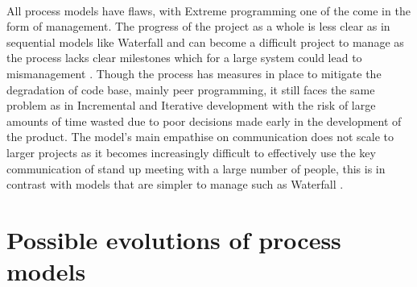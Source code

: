 \documentclass{style/CRPITStyle}
\renewcommand{\cite}{\citep}
\begin{document}
\paragraph{}
All process models have flaws, with Extreme programming one of the come in the
form of management. The progress of the project as a whole is less clear as in
sequential models like Waterfall and can become a difficult project to manage
as the process lacks clear milestones which for a large system could lead to
mismanagement \cite{khramtchenko:2004:xp}. Though the process has measures in
place to mitigate the degradation of code base, mainly peer programming, it 
still faces the same problem as in Incremental and Iterative development with
the risk of large amounts of time wasted due to poor decisions made early in the
development of the product. The model's main empathise on communication does not
scale to larger projects as it becomes increasingly difficult to effectively
use the key communication of stand up meeting with a large number of people,
this is in contrast with models that are simpler to manage such as 
Waterfall \cite{khramtchenko:2004:xp}.

\paragraph{}

\section{Possible evolutions of process models}




\end{document}

